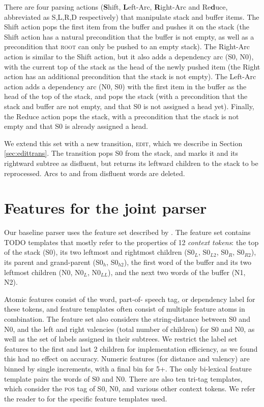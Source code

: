 \documentclass[11pt,letterpaper]{article}
\newcommand{\pos}{\textsc{pos}\xspace}
\newcommand{\szero}{S0\xspace}
\newcommand{\nzero}{N0\xspace}
\newcommand{\szeroH}{S0$_h$\xspace}
\newcommand{\szeroHH}{S0$_{h2}$\xspace}
\newcommand{\szeroL}{S0$_L$\xspace}
\newcommand{\szeroLL}{S0$_{L2}$\xspace}
\newcommand{\szeroR}{S0$_R$\xspace}
\newcommand{\szeroRR}{S0$_{R2}$\xspace}
\newcommand{\nzeroL}{N0$_L$\xspace}
\newcommand{\nzeroLL}{N0$_{LL}$\xspace}
\begin{document}
There are four parsing actions (\textbf{S}hift, \textbf{L}eft-Arc,
\textbf{R}ight-Arc and Re\textbf{d}uce, abbreviated as S,L,R,D respectively)
that manipulate stack and buffer items. The Shift action pops the first item
from the buffer and pushes it on the stack (the Shift action has a natural
precondition that the buffer is not empty, as well as a precondition that
\textsc{root} can only be pushed to an empty stack). The Right-Arc action is
similar to the Shift action, but it also adds a dependency arc (S0, N0),
with the current top of the stack as the head of the newly pushed item (the Right
action has an additional precondition that the stack is not empty). The Left-Arc
action adds a dependency arc (N0, S0) with the first item in the buffer as the
head of the top of the stack, and pops the stack (with a precondition that the
stack and buffer are not empty, and that S0 is not assigned a head yet). Finally,
the Reduce action pops the stack, with a precondition that the stack is not empty
and that S0 is already assigned a head.

We extend this set with a new transition, \textsc{edit}, which we describe in
Section \ref{sec:edittrans}.  The transition pops S0 from the stack, and marks
it and its rightward subtree as disfluent, but returns its leftward children to
the stack to be reprocessed.  Arcs to and from disfluent words are deleted.

\section{Features for the joint parser}

Our baseline parser uses the feature set described by \citet{zhang:11}.
The feature set contains TODO templates that mostly refer to the properties of
12 \emph{context tokens}: the top of the stack (\szero), its two leftmost and
rightmost children (\szeroL, \szeroLL, \szeroR, \szeroRR), its parent and
grand-parent (\szeroH, \szeroHH), the first word of the buffer and its two leftmost
children (\nzero, \nzeroL, \nzeroLL), and the next two words of the buffer (N1, N2).

Atomic features consist of the word, part-of- speech tag, or dependency label
for these tokens, and feature templates often consist of multiple feature atoms
in combination.  The feature set also considers the string-distance between \szero
and \nzero, and the left and right valencies
(total number of children) for \szero and \nzero, as well as the set of labels
assigned in their subtrees. We restrict the label set features to the first and
last 2 children for implementation efficiency, as we found this had no effect on
accuracy. Numeric features (for distance and valency) are binned by single
increments, with a final bin for 5+.  The only bi-lexical feature template pairs
the words of \szero and \nzero.
There are also ten tri-tag templates, which consider the
\pos tag of \szero, \nzero, and various other context tokens.
We refer the reader to \citet{zhang:11} for the specific feature
templates used.
\end{document}
